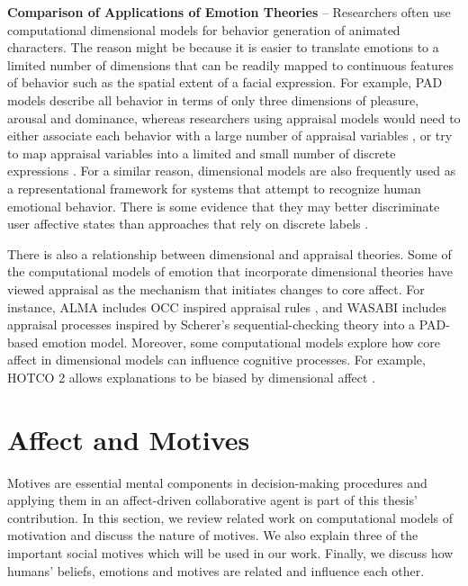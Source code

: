 \documentclass[12pt]{report}
\begin{document}
\textbf{Comparison of Applications of Emotion Theories} -- Researchers often use
computational dimensional models for behavior generation of animated characters.
The reason might be because it is easier to translate emotions to a limited
number of dimensions that can be readily mapped to continuous features of
behavior such as the spatial extent of a facial expression. For example, PAD
models describe all behavior in terms of only three dimensions of pleasure,
arousal and dominance, whereas researchers using appraisal models would need to
either associate each behavior with a large number of appraisal variables
\cite{scherer:expression-appraisal}
\cite{smith:computational-facial-expression}, or try to map appraisal variables
into a limited and small number of discrete expressions
\cite{elliott:affective-reasoner}. For a similar reason, dimensional models are
also frequently used as a representational framework for systems that attempt to
recognize human emotional behavior. There is some evidence that they may better
discriminate user affective states than approaches that rely on discrete labels
\cite{barrett:emotions-natural}.

There is also a relationship between dimensional and appraisal theories. Some of
the computational models of emotion that incorporate dimensional theories have
viewed appraisal as the mechanism that initiates changes to core affect. For
instance, ALMA \cite{gebhard:alma} includes OCC inspired appraisal rules
\cite{occ:structure}, and WASABI \cite{becker:wasabi} includes appraisal
processes inspired by Scherer's sequential-checking theory into a PAD-based
emotion model. Moreover, some computational models explore how core affect in
dimensional models can influence cognitive processes. For example, HOTCO 2
\cite{thagard:emotional-coherence} allows explanations to be biased by
dimensional affect \cite{marsella:computational-models}.

\section{Affect and Motives}
\label{sec:affect-motives}
Motives are essential mental components in decision-making procedures and
applying them in an affect-driven collaborative agent is part of this thesis'
contribution. In this section, we review related work on computational models
of motivation and discuss the nature of motives. We also explain three of the
important social motives which will be used in our work. Finally, we discuss
how humans' beliefs, emotions and motives are related and influence each other. 
\end{document}

